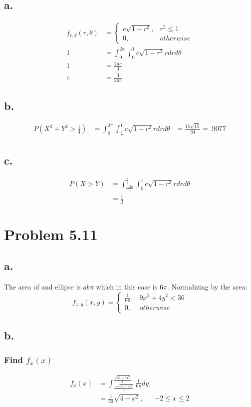 \documentclass[12pt]{article}
\begin{document}
\subsection*{a.}
\begin{align*}
 f_{r,\theta}(r,\theta) &= 
 \begin{cases}
   c\sqrt{1-r^2}, & r^2 \leq 1 \\
   0, & otherwise
 \end{cases} \\
 1 &= \int_0^{2\pi} \int_0^1 c\sqrt{1-r^2}rdrd\theta \\
 1 &= \frac{2\pi c}{3} \\
 c &= \frac{3}{2\pi c}
\end{align*}

\subsection*{b.}
\begin{align*}
  P(X^2 + Y^2 > \frac{1}{4}) &= \int_0^{2\pi} \int_\frac{1}{4}^1 c\sqrt{1-r^2}rdrd\theta
  &= \frac{15\sqrt{15}}{64} = .9077
\end{align*}

\subsection*{c.}
\begin{align*}
  P(X>Y) &= \int_{\frac{-3\pi}{4}}^{\frac{\pi}{4}} \int_0^1 c\sqrt{1-r^2}rdrd\theta \\
  &= \frac{1}{2}
\end{align*}

\section*{Problem 5.11}
\subsection*{a.}
The area of and ellipse is $ab\pi$ which in this case is $6\pi$. Normalizing by the area:
\[f_{x,y}(x,y) = 
\begin{cases}
\frac{1}{6\pi}, & 9x^2 + 4y^2  < 36 \\
0, & otherwise
\end{cases}
\]
\subsection*{b.}
\subsubsection*{Find $f_x(x)$}
\begin{align*}
  f_x(x) &= \int_{\frac{-\sqrt{36-9x^2}}{4}}^{\frac{\sqrt{36-9x^2}}{4}}\frac{1}{6\pi} dy \\
  &= \frac{1}{2\pi} \sqrt{4-x^2}, & -2 \leq x \leq 2
\end{align*}
\end{document}
